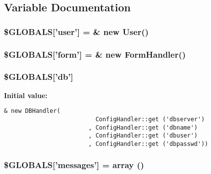 \subsection{Variable Documentation}
\hypertarget{OWLloader_8php_6ca8a3deb7e1b32adc92d8cb72617832}{
\subsubsection{\setlength{\rightskip}{0pt plus 5cm}\$GLOBALS\mbox{[}'user'\mbox{]} = \& new {\bf User}()}}
\label{OWLloader_8php_6ca8a3deb7e1b32adc92d8cb72617832}


\hypertarget{OWLloader_8php_4c382a365fdd6a17e22f8ee2ee727eb4}{
\subsubsection{\setlength{\rightskip}{0pt plus 5cm}\$GLOBALS\mbox{[}'form'\mbox{]} = \& new {\bf FormHandler}()}}
\label{OWLloader_8php_4c382a365fdd6a17e22f8ee2ee727eb4}


\hypertarget{OWLloader_8php_14159e18d9b64fd1e16054f784eda311}{
\subsubsection{\setlength{\rightskip}{0pt plus 5cm}\$GLOBALS\mbox{[}'db'\mbox{]}}}
\label{OWLloader_8php_14159e18d9b64fd1e16054f784eda311}


\textbf{Initial value:}

\begin{Code}\begin{verbatim}& new DBHandler(
                          ConfigHandler::get ('dbserver')
                        , ConfigHandler::get ('dbname')
                        , ConfigHandler::get ('dbuser')
                        , ConfigHandler::get ('dbpasswd'))
\end{verbatim}
\end{Code}
\hypertarget{OWLloader_8php_65f2996116eed36e9ab25f254a470259}{
\subsubsection{\setlength{\rightskip}{0pt plus 5cm}\$GLOBALS\mbox{[}'messages'\mbox{]} = array ()}}
\label{OWLloader_8php_65f2996116eed36e9ab25f254a470259}


